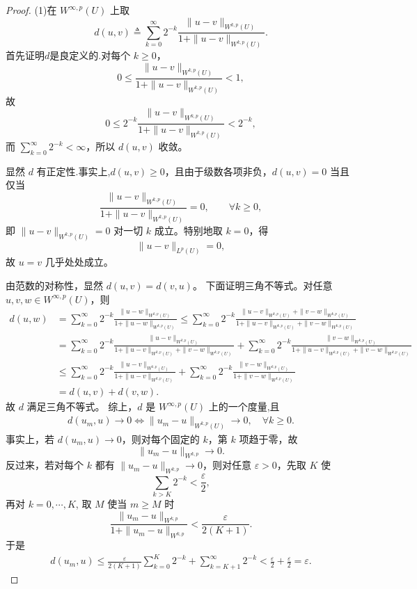 \documentclass[../../main.tex]{subfiles}
\begin{document}
\begin{proof}

(1)在 \(W^{\infty,p}(U)\) 上取
\[
d(u,v)\triangleq
\sum_{k=0}^{\infty}2^{-k}
\frac{\|u-v\|_{W^{k,p}(U)}}{1+\|u-v\|_{W^{k,p}(U)}}.
\]
首先证明$d$是良定义的.对每个 $k\geqslant0$，
\[
0\leqslant\frac{\|u-v\|_{W^{k,p}(U)}}{1+\|u-v\|_{W^{k,p}(U)}}<1,
\]
故
\[
0\leqslant2^{-k}\frac{\|u-v\|_{W^{k,p}(U)}}{1+\|u-v\|_{W^{k,p}(U)}}<2^{-k},
\]
而 $\sum_{k=0}^{\infty}2^{-k}<\infty$，所以 $d(u,v)$ 收敛。

显然 $d$ 有正定性.事实上,$d(u,v)\geqslant0$，且由于级数各项非负，$d(u,v)=0$ 当且仅当
\[
\frac{\|u-v\|_{W^{k,p}(U)}}{1+\|u-v\|_{W^{k,p}(U)}}=0,\qquad\forall k\geqslant0,
\]
即 $\|u-v\|_{W^{k,p}(U)}=0$ 对一切 $k$ 成立。特别地取 $k=0$，得
\[
\|u-v\|_{L^p(U)}=0,
\]
故 $u=v$ 几乎处处成立。

由范数的对称性，显然 $d(u,v)=d(v,u)$。
下面证明三角不等式。对任意 $u,v,w\in W^{\infty,p}(U)$，则
\begin{align*}
d(u,w)
&=\sum_{k=0}^{\infty}2^{-k}
\frac{\|u-w\|_{W^{k,p}(U)}}{1+\|u-w\|_{W^{k,p}(U)}}\leqslant\sum_{k=0}^{\infty}2^{-k}
\frac{\|u-v\|_{W^{k,p}(U)}+\|v-w\|_{W^{k,p}(U)}}
{1+\|u-v\|_{W^{k,p}(U)}+\|v-w\|_{W^{k,p}(U)}}\\
&=\sum_{k=0}^{\infty}2^{-k}
\frac{\|u-v\|_{W^{k,p}(U)}}
{1+\|u-v\|_{W^{k,p}(U)}+\|v-w\|_{W^{k,p}(U)}}+\sum_{k=0}^{\infty}2^{-k}
\frac{\|v-w\|_{W^{k,p}(U)}}
{1+\|u-v\|_{W^{k,p}(U)}+\|v-w\|_{W^{k,p}(U)}}\\
&\leqslant\sum_{k=0}^{\infty}2^{-k}
\frac{\|u-v\|_{W^{k,p}(U)}}{1+\|u-v\|_{W^{k,p}(U)}}
+\sum_{k=0}^{\infty}2^{-k}
\frac{\|v-w\|_{W^{k,p}(U)}}{1+\|v-w\|_{W^{k,p}(U)}}\\
&=d(u,v)+d(v,w).
\end{align*}
故 $d$ 满足三角不等式。
综上，$d$ 是 $W^{\infty,p}(U)$ 上的一个度量,且
\begin{align}
d(u_m,u)\to0
\iff
\|u_m-u\|_{W^{k,p}(U)}\to0,\quad \forall k\geqslant0.\label{eq::VJJKNSDLFJKDJFw8384y4873444}
\end{align}
事实上，若 \(d(u_m,u)\to0\)，则对每个固定的 \(k\)，第 \(k\) 项趋于零，故
\[
\|u_m-u\|_{W^{k,p}}\to0.
\]
反过来，若对每个 \(k\) 都有 \(\|u_m-u\|_{W^{k,p}}\to0\)，则对任意 \(\varepsilon>0\)，先取 \(K\) 使
\[
\sum_{k>K}2^{-k}<\frac{\varepsilon}{2},
\]
再对 \(k=0,\cdots,K\), 取 \(M\) 使当 \(m\geqslant M\) 时
\[
\frac{\|u_m-u\|_{W^{k,p}}}{1+\|u_m-u\|_{W^{k,p}}}
<\frac{\varepsilon}{2(K+1)}.
\]
于是
\begin{align*}
d(u_m,u)\leqslant \frac{\varepsilon}{2\left( K+1 \right)}\sum_{k=0}^K{2^{-k}}+\sum_{k=K+1}^{\infty}{2^{-k}}<\frac{\varepsilon}{2}+\frac{\varepsilon}{2}=\varepsilon .
\end{align*}


\end{proof}
\end{document}

